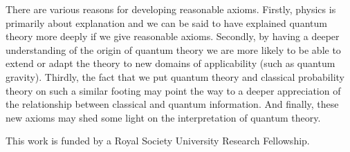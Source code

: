 \documentclass[10pt]{article}
\begin{document}
There are various reasons for developing reasonable axioms.  Firstly,
physics is primarily about explanation and we can be said to have
explained quantum theory more deeply if we give reasonable axioms.
Secondly, by having a deeper understanding of the origin of quantum
theory we are more likely to be able to extend or adapt the theory to
new domains of applicability (such as quantum gravity).  Thirdly, the
fact that we put quantum theory and classical probability theory on such
a similar footing may point the way to a deeper appreciation of
the relationship between classical and quantum information.
And finally, these new axioms may shed some light on the interpretation
of quantum theory.

\vspace{6mm}


\vspace{6mm}

This work is funded by a Royal Society University Research Fellowship.
\end{document}
